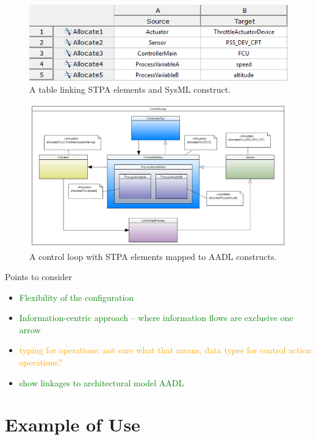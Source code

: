 \documentclass[conference]{IEEEtran}
\renewcommand{\todo}[1]{\textcolor{orange}{#1}}
\newcommand{\done}[1]{\textcolor{green}{#1}}
\begin{document}
\begin{figure}[hbtp]
  \centering
  \includegraphics[scale=0.6]{fig/stpa_aadl_allocation_table.png}
  \caption{A table linking STPA elements and SysML construct.}
  \label{fig:stpa_aadl_allocation_table}
\end{figure}

\begin{figure}[hbtp]
  \centering
  \includegraphics[scale=0.3]{fig/control_loop_with_allocations.png}
  \caption{A control loop with STPA elements mapped to AADL constructs.}
  \label{fig:control_loop_with_allocations}
\end{figure}

Points to consider

\begin{itemize}
\item \done{Flexibility of the configuration}
\item \done{Information-centric approach -- where information flows are
exclusive one arrow}
\item \todo{typing for operations: not sure what that means, data types for
control action operations?}

\item \done{show linkages to architectural model AADL}
\end{itemize}
\section{Example of Use}\label{AA}
\end{document}
